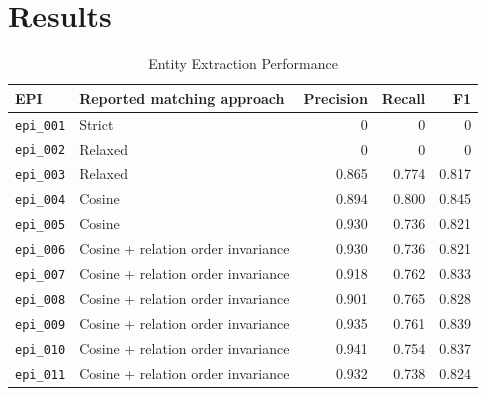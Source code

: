 \chapter{Results}
\label{chap:results}

\begin{table}[H]
    \centering
    \caption{Entity Extraction Performance}
    \label{tab:entity_results}
    \begin{tabularx}{\textwidth}{l l r r r}
        \toprule
        EPI & Reported matching approach & Precision & Recall & F1 \\
        \midrule
        \texttt{epi\_001} & Strict & 0 & 0 & 0 \\
        \texttt{epi\_002} & Relaxed & 0 & 0 & 0 \\
        \texttt{epi\_003} & Relaxed & 0.865 & 0.774 & 0.817 \\
        \texttt{epi\_004} & Cosine & 0.894 & 0.800 & 0.845 \\
        \texttt{epi\_005} & Cosine & 0.930 & 0.736 & 0.821 \\
        \texttt{epi\_006} & Cosine + relation order invariance & 0.930 & 0.736 & 0.821 \\
        \texttt{epi\_007} & Cosine + relation order invariance & 0.918 & 0.762 & 0.833 \\
        \texttt{epi\_008} & Cosine + relation order invariance & 0.901 & 0.765 & 0.828 \\
        \texttt{epi\_009} & Cosine + relation order invariance & 0.935 & 0.761 & 0.839 \\
        \texttt{epi\_010} & Cosine + relation order invariance & 0.941 & 0.754 & 0.837 \\
        \texttt{epi\_011} & Cosine + relation order invariance & 0.932 & 0.738 & 0.824 \\
        \bottomrule
    \end{tabularx}
\end{table}

